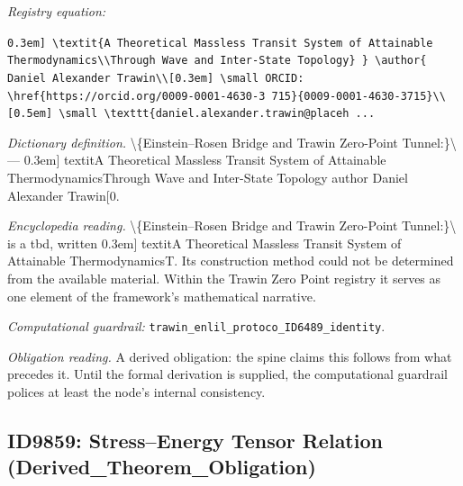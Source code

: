 \documentclass[11pt]{article}
\theoremstyle{remark}
\begin{document}
\noindent\textit{Registry equation:}\par
{\small\texttt{0.3em] \textbackslash{}textit\{A Theoretical Massless Transit System of Attainable Thermodynamics\textbackslash{}\textbackslash{}Through Wave and Inter-State Topology\} \} \textbackslash{}author\{ Daniel Alexander Trawin\textbackslash{}\textbackslash{}[0.3em] \textbackslash{}small ORCID: \textbackslash{}href\{https://orcid.org/0009-0001-4630-3 715\}\{0009-0001-4630-3715\}\textbackslash{}\textbackslash{}[0.5em] \textbackslash{}small \textbackslash{}texttt\{daniel.alexander.trawin@placeh ...}}\par\medskip
\noindent\textit{Dictionary definition.} \textbackslash{}\{Einstein--Rosen Bridge and Trawin Zero-Point Tunnel:\}\textbackslash{} --- 0.3em] textitA Theoretical Massless Transit System of Attainable ThermodynamicsThrough Wave and Inter-State Topology author Daniel Alexander Trawin[0.\par\medskip
\noindent\textit{Encyclopedia reading.} \textbackslash{}\{Einstein--Rosen Bridge and Trawin Zero-Point Tunnel:\}\textbackslash{} is a tbd, written 0.3em] textitA Theoretical Massless Transit System of Attainable ThermodynamicsT. Its construction method could not be determined from the available material. Within the Trawin Zero Point registry it serves as one element of the framework's mathematical narrative.
\par\medskip\noindent\textit{Computational guardrail:} \texttt{trawin\_enlil\_protoco\_ID6489\_identity}.
\par\medskip\noindent\textit{Obligation reading.} A derived obligation: the spine claims this follows from what precedes it. Until the formal derivation is supplied, the computational guardrail polices at least the node's internal consistency.

\subsection{ID9859: Stress--Energy Tensor Relation (Derived\_Theorem\_Obligation)}
\end{document}
